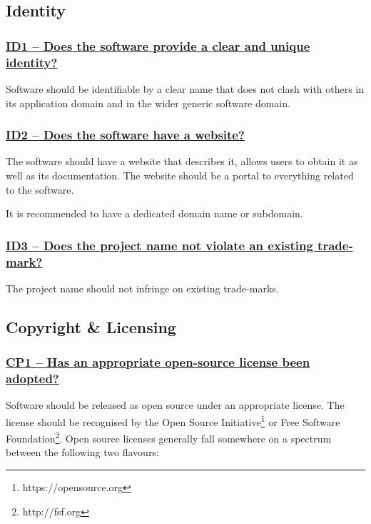 \documentclass[a4paper,11pt]{article}
\newcommand{\criterion}[1]{\subsubsection*{\underline{#1}}}
\begin{document}
\subsection{Identity}\label{sec:ide}

\newcommand{\idOneID}{ID1}
\newcommand{\idOneText}{Does the software provide a clear and unique identity?}
\criterion{\idOneID{ }--{ }\idOneText}\label{id:id1} 

Software should be identifiable by a clear name that does not clash with others
in its application domain and in the wider generic software domain. 

\newcommand{\idTwoID}{ID2}
\newcommand{\idTwoText}{Does the software have a website?}
\criterion{\idTwoID{ }--{ }\idTwoText}\label{id:id2} 

The software should have a website that describes it, allows users to obtain
it as well as its documentation. The website should be a portal to everything
related to the software.

It is recommended to have a dedicated domain name or subdomain.

\newcommand{\idThreeID}{ID3}
\newcommand{\idThreeText}{Does the project name not violate an existing trade-mark?}
\criterion{\idThreeID{ }--{ }\idThreeText}\label{id:id3} 

The project name should not infringe on existing trade-marks.

\subsection{Copyright \& Licensing}\label{sec:cop}

\newcommand{\cpOneID}{CP1}
\newcommand{\cpOneText}{Has an appropriate open-source license been adopted?}
\criterion{\cpOneID{ }--{ }\cpOneText}\label{id:cp1} 

Software should be released as open source under an appropriate license. The
license should be recognised by the Open Source Initiative\footnote{https://opensource.org} or Free Software
Foundation\footnote{http://fsf.org}. Open source licenses generally fall somewhere on a spectrum between the following two flavours:
\end{document}
